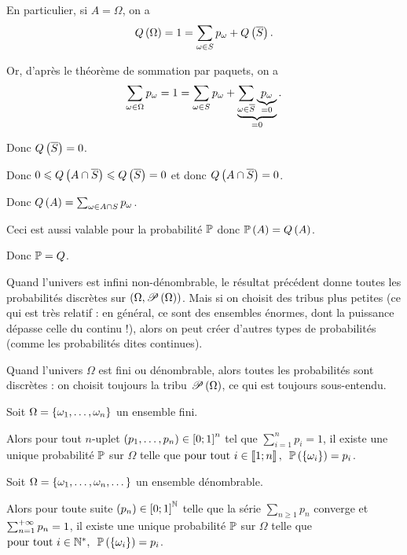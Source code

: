 \begin{dem}
En particulier, si \(A=\Omega\), on a \[Q\paren{\Omega}=1=\sum_{\omega\in S}p_\omega+Q\paren{\conj{S}}.\]

Or, d'après le théorème de sommation par paquets, on a \[\sum_{\omega\in\Omega}p_\omega=1=\sum_{\omega\in S}p_\omega+\underbrace{\sum_{\omega\in\conj{S}}\underbrace{p_\omega}_{=0}}_{=0}.\]

Donc \(Q\paren{\conj{S}}=0\).

Donc \(0\leq Q\paren{A\inter\conj{S}}\leq Q\paren{\conj{S}}=0\) et donc \(Q\paren{A\inter\conj{S}}=0\).

Donc \(Q\paren{A}=\sum_{\omega\in A\inter S}p_\omega\).

Ceci est aussi valable pour la probabilité \(\prem\) donc \(\proba{A}=Q\paren{A}\).

Donc \(\prem=Q\).
\end{dem}

Quand l'univers est infini non-dénombrable, le résultat précédent donne toutes les probabilités discrètes sur \(\groupe{\Omega}[\P{\Omega}]\). Mais si on choisit des tribus plus petites (ce qui est très relatif : en général, ce sont des ensembles énormes, dont la puissance dépasse celle du continu !), alors on peut créer d'autres types de probabilités (comme les probabilités dites continues).

Quand l'univers \(\Omega\) est fini ou dénombrable, alors toutes les probabilités sont discrètes : on choisit toujours la tribu \(\P{\Omega}\), ce qui est toujours sous-entendu.

\begin{prop}
Soit \(\Omega=\accol{\omega_1,\dots,\omega_n}\) un ensemble fini.

Alors pour tout \(n\)-uplet \(\paren{p_1,\dots,p_n}\in\intervii{0}{1}^n\) tel que \(\sum_{i=1}^np_i=1\), il existe une unique probabilité \(\prem\) sur \(\Omega\) telle que \(\quantifs{\tpt i\in\interventierii{1}{n}}\proba{\accol{\omega_i}}=p_i\).
\end{prop}

\begin{prop}
Soit \(\Omega=\accol{\omega_1,\dots,\omega_n,\dots}\) un ensemble dénombrable.

Alors pour toute suite \(\paren{p_n}\in\intervii{0}{1}^\N\) telle que la série \(\sum_{n\geq1}p_n\) converge et \(\sum_{n=1}^{\pinf}p_n=1\), il existe une unique probabilité \(\prem\) sur \(\Omega\) telle que \(\quantifs{\tpt i\in\Ns}\proba{\accol{\omega_i}}=p_i\).
\end{prop}

